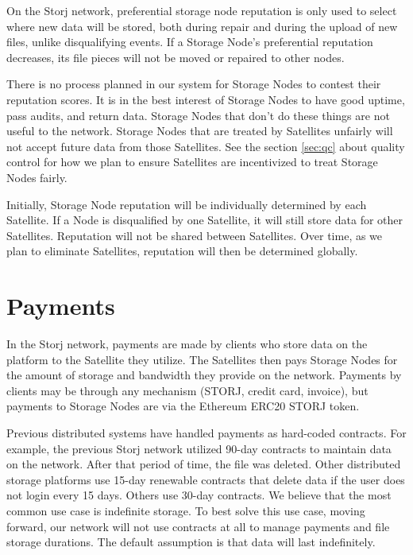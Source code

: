 \documentclass[8pt,fleqn,openany]{book}
\begin{document}
On the Storj network, preferential storage node reputation is only used to
select where new data will be stored, both during repair and during the
upload of new files, unlike disqualifying events.
If a Storage Node's preferential reputation decreases, its file pieces will not
be moved or repaired to other nodes.

There is no process planned in our system for Storage Nodes to contest their
reputation scores. It is in the best interest of Storage Nodes to have good
uptime, pass audits, and return data. Storage Nodes that don't do these things
are not useful to the network. Storage Nodes that are treated by Satellites
unfairly will not accept future data from those Satellites. See the section
\ref{sec:qc} about quality control for how we plan to ensure Satellites are
incentivized to treat Storage Nodes fairly.

Initially, Storage Node reputation will be individually determined by each
Satellite. If a Node is disqualified by one Satellite, it will still
store data for other Satellites. Reputation will not be shared between
Satellites. Over time, as we plan to eliminate Satellites,
reputation will then be determined globally.

\section{Payments}\label{sec:concrete-payments}

In the Storj network, payments are made by clients who store data on the
platform to the Satellite they utilize.
The Satellites then pays Storage Nodes for the amount of storage and bandwidth
they provide on the network.
Payments by clients may be through any mechanism (STORJ, credit card, invoice),
but payments to Storage Nodes are via the Ethereum ERC20 \cite{erc20} STORJ
token.

Previous distributed systems have handled payments as hard-coded contracts.
For example, the previous Storj network utilized 90-day contracts to maintain
data on the network. After that period of time, the file was deleted.
Other distributed storage platforms use 15-day renewable contracts that delete
data if the user does not login every 15 days. Others use 30-day contracts.
We believe that the most common use case is indefinite storage. To best solve
this use case,
moving forward, our network will not use contracts at all to manage payments
and file storage durations. The default assumption is that data will last
indefinitely.
\end{document}
